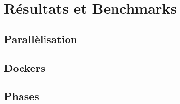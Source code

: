 \chapter{Résultats et Benchmarks}
\label{ch:results}

\section{Parallèlisation}
\section{Dockers}
\section{Phases}